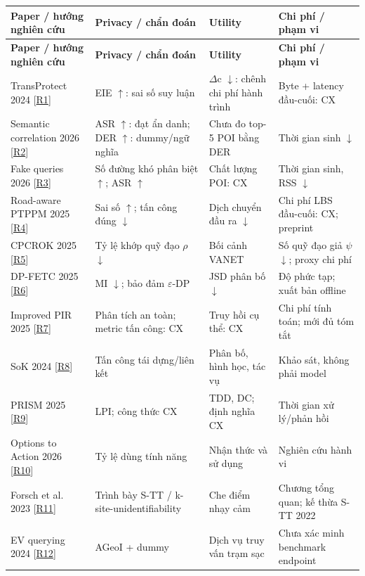 \documentclass[10pt,a4paper]{article}
\begin{document}
\begingroup\small
\begin{longtable}{@{}P{3.871cm}P{4.355cm}P{3.871cm}P{4.258cm}@{}}
\toprule
\textbf{Paper / hướng nghiên cứu} & \textbf{Privacy / chẩn đoán} & \textbf{Utility} & \textbf{Chi phí / phạm vi}\\\midrule
\endfirsthead
\toprule
\textbf{Paper / hướng nghiên cứu} & \textbf{Privacy / chẩn đoán} & \textbf{Utility} & \textbf{Chi phí / phạm vi}\\\midrule
\endhead
\bottomrule\endfoot
TransProtect 2024 [\hyperlink{ref-R1}{R1}] & EIE $\uparrow$: sai số suy luận & $\Delta$c $\downarrow$: chênh chi phí hành trình & Byte + latency đầu-cuối: CX\\
\addlinespace[3pt]
Semantic correlation 2026 [\hyperlink{ref-R2}{R2}] & ASR $\uparrow$: đạt ẩn danh; DER $\uparrow$: dummy/ngữ nghĩa & Chưa đo top-5 POI bằng DER & Thời gian sinh $\downarrow$\\
\addlinespace[3pt]
Fake queries 2026 [\hyperlink{ref-R3}{R3}] & Số đường khó phân biệt $\uparrow$; ASR $\uparrow$ & Chất lượng POI: CX & Thời gian sinh, RSS $\downarrow$\\
\addlinespace[3pt]
Road-aware PTPPM 2025 [\hyperlink{ref-R4}{R4}] & Sai số $\uparrow$; tấn công đúng $\downarrow$ & Dịch chuyển đầu ra $\downarrow$ & Chi phí LBS đầu-cuối: CX; preprint\\
\addlinespace[3pt]
CPCROK 2025 [\hyperlink{ref-R5}{R5}] & Tỷ lệ khớp quỹ đạo $\rho$ $\downarrow$ & Bối cảnh VANET & Số quỹ đạo giả $\psi$ $\downarrow$; proxy chi phí\\
\addlinespace[3pt]
DP-FETC 2025 [\hyperlink{ref-R6}{R6}] & MI $\downarrow$; bảo đảm $\varepsilon$-DP & JSD phân bố $\downarrow$ & Độ phức tạp; xuất bản offline\\
\addlinespace[3pt]
Improved PIR 2025 [\hyperlink{ref-R7}{R7}] & Phân tích an toàn; metric tấn công: CX & Truy hồi cụ thể: CX & Chi phí tính toán; mới đủ tóm tắt\\
\addlinespace[3pt]
SoK 2024 [\hyperlink{ref-R8}{R8}] & Tấn công tái dựng/liên kết & Phân bố, hình học, tác vụ & Khảo sát, không phải model\\
\addlinespace[3pt]
PRISM 2025 [\hyperlink{ref-R9}{R9}] & LPI; công thức CX & TDD, DC; định nghĩa CX & Thời gian xử lý/phản hồi\\
\addlinespace[3pt]
Options to Action 2026 [\hyperlink{ref-R10}{R10}] & Tỷ lệ dùng tính năng & Nhận thức và sử dụng & Nghiên cứu hành vi\\
\addlinespace[3pt]
Forsch et al. 2023 [\hyperlink{ref-R11}{R11}] & Trình bày S-TT / k-site-unidentifiability & Che điểm nhạy cảm & Chương tổng quan; kế thừa S-TT 2022\\
\addlinespace[3pt]
EV querying 2024 [\hyperlink{ref-R12}{R12}] & AGeoI + dummy & Dịch vụ truy vấn trạm sạc & Chưa xác minh benchmark endpoint\\
\end{longtable}
\end{document}

